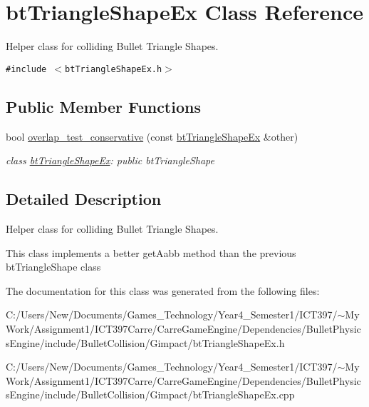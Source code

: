 \hypertarget{classbt_triangle_shape_ex}{
\section{btTriangleShapeEx Class Reference}
\label{classbt_triangle_shape_ex}
}
Helper class for colliding Bullet Triangle Shapes.  


{\tt \#include $<$btTriangleShapeEx.h$>$}

\subsection*{Public Member Functions}
\begin{CompactItemize}
\item 
\hypertarget{classbt_triangle_shape_ex_8642843da440361eecf27d5a074d6231}{
bool \hyperlink{classbt_triangle_shape_ex_8642843da440361eecf27d5a074d6231}{overlap\_\-test\_\-conservative} (const \hyperlink{classbt_triangle_shape_ex}{btTriangleShapeEx} \&other)}
\label{classbt_triangle_shape_ex_8642843da440361eecf27d5a074d6231}

\begin{CompactList}\small\item\em class \hyperlink{classbt_triangle_shape_ex}{btTriangleShapeEx}: public btTriangleShape \item\end{CompactList}\end{CompactItemize}


\subsection{Detailed Description}
Helper class for colliding Bullet Triangle Shapes. 

This class implements a better getAabb method than the previous btTriangleShape class 

The documentation for this class was generated from the following files:\begin{CompactItemize}
\item 
C:/Users/New/Documents/Games\_\-Technology/Year4\_\-Semester1/ICT397/$\sim$My Work/Assignment1/ICT397Carre/CarreGameEngine/Dependencies/BulletPhysicsEngine/include/BulletCollision/Gimpact/btTriangleShapeEx.h\item 
C:/Users/New/Documents/Games\_\-Technology/Year4\_\-Semester1/ICT397/$\sim$My Work/Assignment1/ICT397Carre/CarreGameEngine/Dependencies/BulletPhysicsEngine/include/BulletCollision/Gimpact/btTriangleShapeEx.cpp\end{CompactItemize}
